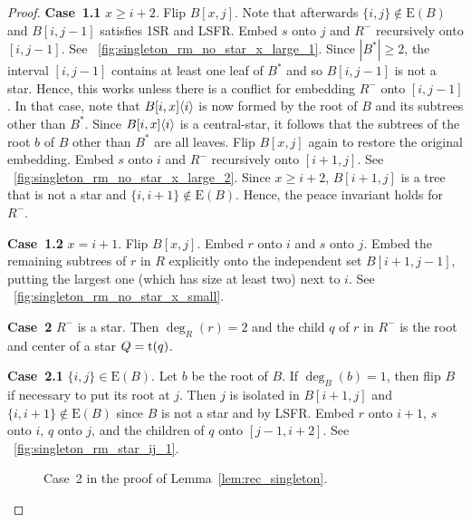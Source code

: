 \documentclass[11pt,a4paper,colorlinks=true,urlcolor=blue,citecolor=red]{article}
\theoremstyle{plain}
\newcommand{\case}[1]{\par\vspace{.5\baselineskip}\noindent\textbf{\sffamily Case~#1}}
\newcommand{\EB}{\mathrm{E}(B)}
\begin{document}
\begin{proof}
  \case{1.1} $x\geq i+2$. Flip $B[x,j]$. Note that afterwards
  $\{i,j\}\not\in\EB$ and $B[i,j-1]$ satisfies 1SR and LSFR.
  Embed $s$ onto $j$ and $R^-$ recursively onto $[i,j-1]$. See
  \figurename~\ref{fig:singleton_rm_no_star_x_large_1}. Since $|B^*|\geq
  2$, the interval $[i,j-1]$ contains at least one leaf of $B^*$ and so
  $B[i,j-1]$ is not a star. Hence, this works unless there is a
  conflict for embedding $R^-$ onto $[i,j-1]$. In that case, note
  that $B{[i,x]}\langle{i}\rangle$ is now formed by the root of $B$ and its
  subtrees other than $B^*$. Since $B{[i,x]}\langle{i}\rangle$ is a
  central-star, it follows that the subtrees of the root $b$ of $B$
  other than $B^*$ are all leaves. Flip $B[x,j]$ again to restore the
  original embedding. Embed $s$ onto $i$ and $R^-$ recursively onto
  $[i+1,j]$. See \figurename~\ref{fig:singleton_rm_no_star_x_large_2}.
  Since $x\geq i+2$, $B[i+1,j]$ is a tree that is not a star and
  $\{i,i+1\}\not\in\EB$. Hence, the peace invariant holds for
  $R^-$.

  \case{1.2} $x=i+1$. Flip $B[x,j]$. Embed $r$ onto $i$ and $s$ onto
  $j$. Embed the remaining subtrees of $r$ in $R$ explicitly onto the
  independent set $B[i+1,j-1]$, putting the largest one (which has size
  at least two) next to $i$. See
  \figurename~\ref{fig:singleton_rm_no_star_x_small}.

  \case{2} $R^-$ is a star. Then $\deg_R(r)=2$ and the child $q$ of $r$
  in $R^-$ is the root and center of a star $Q=\mathrm t(q)$.

  \case{2.1} $\{i,j\}\in\EB$. Let $b$ be the root of $B$. If
  $\deg_B(b)=1$, then flip $B$ if necessary to put its root at
  $j$. Then $j$ is isolated in $B[i+1,j]$ and $\{i,i+1\}\not\in\EB$
  since $B$ is not a star and by LSFR. Embed $r$ onto $i+1$, $s$ onto
  $i$, $q$ onto $j$, and the children of $q$ onto $[j-1,i+2]$. See
  \figurename~\ref{fig:singleton_rm_star_ij_1}.

  \begin{figure}[t]
    \centering\hfil {}\hfil {}\hfil {}\hfil {}\hfil {}\hfil \caption{Case~2 in the proof of Lemma~\ref{lem:rec_singleton}.}
  \end{figure}


\end{proof}
\end{document}
